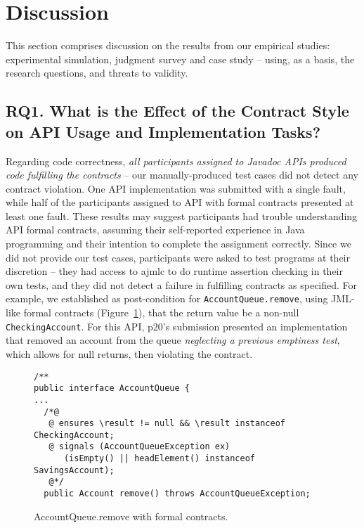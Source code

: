 \section{Discussion}
\label{sec:discussion}

This section comprises discussion on the results from our empirical studies: experimental simulation, judgment survey and case study -- using, as a basis, the research questions, and threats to validity.


\subsection{RQ1. What is the Effect of the Contract Style on API Usage and Implementation Tasks?}
\label{rq1}

Regarding code correctness, \emph{all participants assigned to Javadoc APIs produced code
fulfilling the contracts} -- our manually-produced test cases did not detect any contract violation. One \contractjdoc{} API implementation was submitted with a single fault, while half of the participants assigned to API with formal contracts presented at least one fault.
These results may suggest participants had trouble understanding API formal contracts, assuming their self-reported experience in Java programming and their intention to complete the assignment correctly.
Since we did not provide our test cases, participants were asked to test programs at their discretion -- they had access to ajmlc to do runtime assertion checking in their own tests, and they did not detect a failure in fulfilling contracts as specified.
For example, we established as post-condition for \texttt{AccountQueue.remove}, using JML-like formal contracts (Figure~\ref{code:remove}), that the return value be a non-null \texttt{CheckingAccount}. For this API, p20's submission presented an implementation that removed an account from the queue \emph{neglecting a previous emptiness test}, which allows for null returns, then violating the contract.


\begin{figure}
\centering
\begin{lstlisting}[basicstyle=\footnotesize\ttfamily,name=figxpi, frame=lines, mathescape=true]
/**
public interface AccountQueue {
...
  /*@
   @ ensures \result != null && \result instanceof CheckingAccount;
   @ signals (AccountQueueException ex) 
      (isEmpty() || headElement() instanceof SavingsAccount);
   @*/
  public Account remove() throws AccountQueueException;

\end{lstlisting}
\caption{AccountQueue.remove with formal contracts.}
\label{code:remove}
\end{figure}


